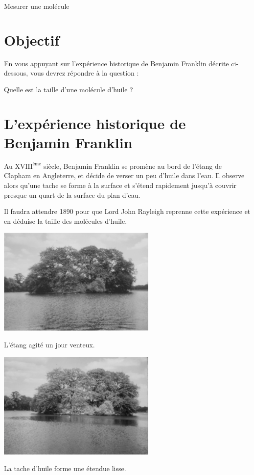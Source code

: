 \documentclass[12pt,a4paper]{article}
\begin{document}
\begin{header}
Mesurer une molécule
\end{header}

\section*{Objectif}

En vous appuyant sur l'expérience historique de Benjamin Franklin décrite ci-dessous, vous devrez répondre à la question :

\begin{objectif}
Quelle est la taille d'une molécule d'huile ?
\end{objectif}

\section*{L'expérience historique de Benjamin Franklin}

Au $\text{XVIII}^\text{ème}$ siècle, Benjamin Franklin se promène au bord de l'étang de Clapham en Angleterre, et décide de verser un peu d'huile dans l'eau. Il observe alors qu'une tache se forme à la surface et s'étend rapidement jusqu'à couvrir presque un quart de la surface du plan d'eau.

Il faudra attendre 1890 pour que Lord John Rayleigh reprenne cette expérience et en déduise la taille des molécules d'huile.

\begin{multicols}{2}
\center
\includegraphics[height=150pt]{images/franklin_lake.png}

L'étang agité un jour venteux.

\includegraphics[height=150pt]{images/franklin_lake_oiled.png}

La tache d'huile forme une étendue lisse.
\end{multicols}
\end{document}
